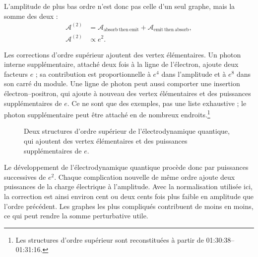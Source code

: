 L’amplitude de plus bas ordre n’est donc pas celle d’un seul graphe, mais la somme des deux :
\begin{equation}
\begin{aligned}
\mathcal{A}^{(2)}
&=
\mathcal{A}_{\mathrm{absorb\ then\ emit}}
+\mathcal{A}_{\mathrm{emit\ then\ absorb}},\\
\mathcal{A}^{(2)}&\propto e^2.
\end{aligned}
\end{equation}

Les corrections d’ordre supérieur ajoutent des vertex élémentaires. Un photon interne supplémentaire, attaché deux fois à la ligne de l’électron, ajoute deux facteurs \(e\) ; sa contribution est proportionnelle à \(e^4\) dans l’amplitude et à \(e^8\) dans son carré du module. Une ligne de photon peut aussi comporter une insertion électron--positron, qui ajoute à nouveau des vertex élémentaires et des puissances supplémentaires de \(e\). Ce ne sont que des exemples, pas une liste exhaustive ; le photon supplémentaire peut être attaché en de nombreux endroits.\footnote{Les structures d’ordre supérieur sont reconstituées à partir de 01:30:38--01:31:16.}

\begin{figure}[htbp]
\centering
{}
\caption{Deux structures d’ordre supérieur de l’électrodynamique quantique, qui ajoutent des vertex élémentaires et des puissances supplémentaires de \(e\).}
\end{figure}

Le développement de l’électrodynamique quantique procède donc par puissances successives de \(e^2\). Chaque complication nouvelle de même ordre ajoute deux puissances de la charge électrique à l’amplitude. Avec la normalisation utilisée ici, la correction est ainsi environ cent ou deux cents fois plus faible en amplitude que l’ordre précédent. Les graphes les plus compliqués contribuent de moins en moins, ce qui peut rendre la somme perturbative utile.


